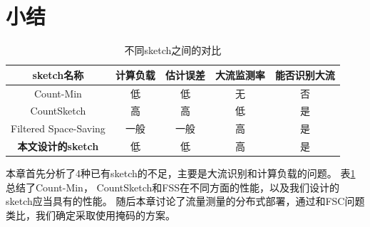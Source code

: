 
\section{小结}

\begin{table}[ht]
	\centering
	\begin{tabular}{c|c|c|c|c}
		\hline
		sketch名称 & 计算负载 &估计误差&大流监测率& 能否识别大流 \\
		\hline
		Count-Min\cite{cormode2004improved} & 低 &低& 无 &否\\
		\hline
		CountSketch\cite{charikar2004finding} & 高 &高 &低&是\\
		\hline
		Filtered Space-Saving\cite{homem2010finding}  & 一般 & 一般&高& 是\\
		\hline
		\textbf{本文设计的sketch} & 低 &低 &高&是\\
		\hline		
	\end{tabular}
	\caption{不同sketch之间的对比}\label{tbl:sketchcompare}
\end{table}
本章首先分析了4种已有sketch的不足，主要是大流识别和计算负载的问题。
表\ref{tbl:sketchcompare}总结了Count-Min， CountSketch和FSS在不同方面的性能，以及我们设计的sketch应当具有的性能。
随后本章讨论了流量测量的分布式部署，通过和FSC问题类比，我们确定采取使用掩码的方案。
